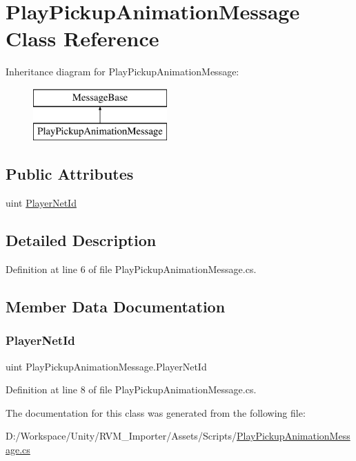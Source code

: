 \hypertarget{class_play_pickup_animation_message}{}\section{Play\+Pickup\+Animation\+Message Class Reference}
\label{class_play_pickup_animation_message}
Inheritance diagram for Play\+Pickup\+Animation\+Message\+:\begin{figure}[H]
\begin{center}
\leavevmode
\includegraphics[height=2.000000cm]{class_play_pickup_animation_message}
\end{center}
\end{figure}
\subsection*{Public Attributes}
\begin{DoxyCompactItemize}
\item 
uint \mbox{\hyperlink{class_play_pickup_animation_message_a605df20de6b297aefb196758f22accc8}{Player\+Net\+Id}}
\end{DoxyCompactItemize}


\subsection{Detailed Description}


Definition at line 6 of file Play\+Pickup\+Animation\+Message.\+cs.



\subsection{Member Data Documentation}
\mbox{\label{class_play_pickup_animation_message_a605df20de6b297aefb196758f22accc8}} 
\subsubsection{\texorpdfstring{PlayerNetId}{PlayerNetId}}
{\footnotesize\ttfamily uint Play\+Pickup\+Animation\+Message.\+Player\+Net\+Id}



Definition at line 8 of file Play\+Pickup\+Animation\+Message.\+cs.



The documentation for this class was generated from the following file\+:\begin{DoxyCompactItemize}
\item 
D\+:/\+Workspace/\+Unity/\+R\+V\+M\+\_\+\+Importer/\+Assets/\+Scripts/\mbox{\hyperlink{_play_pickup_animation_message_8cs}{Play\+Pickup\+Animation\+Message.\+cs}}\end{DoxyCompactItemize}

